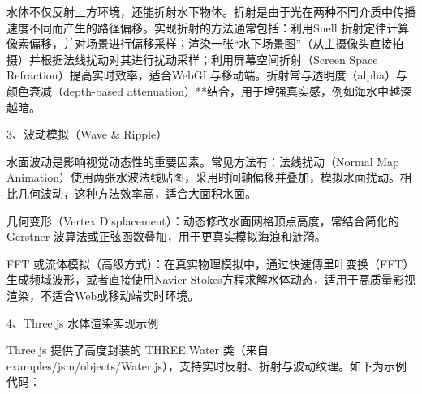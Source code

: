 水体不仅反射上方环境，还能折射水下物体。折射是由于光在两种不同介质中传播速度不同而产生的路径偏移。实现折射的方法通常包括：利用Snell 折射定律计算像素偏移，并对场景进行偏移采样；渲染一张``水下场景图''（从主摄像头直接拍摄）并根据法线扰动对其进行扰动采样；利用屏幕空间折射（Screen Space Refraction）提高实时效率，适合WebGL与移动端。折射常与透明度（alpha）与颜色衰减（depth-based attenuation）**结合，用于增强真实感，例如海水中越深越暗。

3、波动模拟（Wave \& Ripple）

水面波动是影响视觉动态性的重要因素。常见方法有：法线扰动（Normal Map Animation）使用两张水波法线贴图，采用时间轴偏移并叠加，模拟水面扰动。相比几何波动，这种方法效率高，适合大面积水面。

几何变形（Vertex Displacement）：动态修改水面网格顶点高度，常结合简化的Gerstner 波算法或正弦函数叠加，用于更真实模拟海浪和涟漪。

FFT 或流体模拟（高级方式）：在真实物理模拟中，通过快速傅里叶变换（FFT）生成频域波形，或者直接使用Navier-Stokes方程求解水体动态，适用于高质量影视渲染，不适合Web或移动端实时环境。

4、Three.js 水体渲染实现示例

Three.js 提供了高度封装的 THREE.Water 类（来自 examples/jsm/objects/Water.js），支持实时反射、折射与波动纹理。如下为示例代码：

